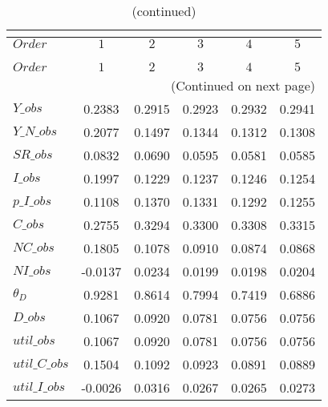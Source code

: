  
\begin{center}
\begin{longtable}{lccccc} 
\caption{COEFFICIENTS OF AUTOCORRELATION}\\
 \label{Table:th_autocorr_matrix}\\
\toprule 
$Order         $	 & 	 $         1$	 & 	 $         2$	 & 	 $         3$	 & 	 $         4$	 & 	 $         5$\\
\midrule \endfirsthead 
\caption{(continued)}\\
 \toprule \\ 
$Order         $	 & 	 $         1$	 & 	 $         2$	 & 	 $         3$	 & 	 $         4$	 & 	 $         5$\\
\midrule \endhead 
\midrule \multicolumn{6}{r}{(Continued on next page)} \\ \bottomrule \endfoot 
\bottomrule \endlastfoot 
$Y\_obs        $	 & 	    0.2383	 & 	    0.2915	 & 	    0.2923	 & 	    0.2932	 & 	    0.2941 \\ 
$Y\_N\_obs     $	 & 	    0.2077	 & 	    0.1497	 & 	    0.1344	 & 	    0.1312	 & 	    0.1308 \\ 
$SR\_obs       $	 & 	    0.0832	 & 	    0.0690	 & 	    0.0595	 & 	    0.0581	 & 	    0.0585 \\ 
$I\_obs        $	 & 	    0.1997	 & 	    0.1229	 & 	    0.1237	 & 	    0.1246	 & 	    0.1254 \\ 
$p\_I\_obs     $	 & 	    0.1108	 & 	    0.1370	 & 	    0.1331	 & 	    0.1292	 & 	    0.1255 \\ 
$C\_obs        $	 & 	    0.2755	 & 	    0.3294	 & 	    0.3300	 & 	    0.3308	 & 	    0.3315 \\ 
$NC\_obs       $	 & 	    0.1805	 & 	    0.1078	 & 	    0.0910	 & 	    0.0874	 & 	    0.0868 \\ 
$NI\_obs       $	 & 	   -0.0137	 & 	    0.0234	 & 	    0.0199	 & 	    0.0198	 & 	    0.0204 \\ 
${\theta_D}    $	 & 	    0.9281	 & 	    0.8614	 & 	    0.7994	 & 	    0.7419	 & 	    0.6886 \\ 
$D\_obs        $	 & 	    0.1067	 & 	    0.0920	 & 	    0.0781	 & 	    0.0756	 & 	    0.0756 \\ 
$util\_obs     $	 & 	    0.1067	 & 	    0.0920	 & 	    0.0781	 & 	    0.0756	 & 	    0.0756 \\ 
$util\_C\_obs  $	 & 	    0.1504	 & 	    0.1092	 & 	    0.0923	 & 	    0.0891	 & 	    0.0889 \\ 
$util\_I\_obs  $	 & 	   -0.0026	 & 	    0.0316	 & 	    0.0267	 & 	    0.0265	 & 	    0.0273 \\ 
\end{longtable}
 \end{center}
